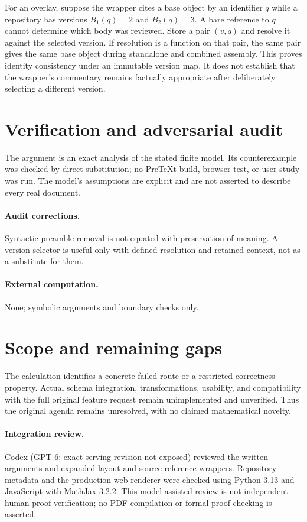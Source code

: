 \documentclass[11pt]{article}
\begin{document}
For an overlay, suppose the wrapper cites a base object by an identifier $q$ while a repository has versions $B_1(q)=2$ and $B_2(q)=3$. A bare reference to $q$ cannot determine which body was reviewed. Store a pair $(v,q)$ and resolve it against the selected version. If resolution is a function on that pair, the same pair gives the same base object during standalone and combined assembly. This proves identity consistency under an immutable version map. It does not establish that the wrapper's commentary remains factually appropriate after deliberately selecting a different version.
\section{Verification and adversarial audit}
The argument is an exact analysis of the stated finite model. Its counterexample was checked by direct substitution; no PreTeXt build, browser test, or user study was run. The model's assumptions are explicit and are not asserted to describe every real document.
\paragraph{Audit corrections.} Syntactic preamble removal is not equated with preservation of meaning. A version selector is useful only with defined resolution and retained context, not as a substitute for them.
\paragraph{External computation.} None; symbolic arguments and boundary checks only.
\section{Scope and remaining gaps}
The calculation identifies a concrete failed route or a restricted correctness property. Actual schema integration, transformations, usability, and compatibility with the full original feature request remain unimplemented and unverified. Thus the original agenda remains unresolved, with no claimed mathematical novelty.
\paragraph{Integration review.} Codex (GPT-6; exact serving revision not exposed) reviewed the written arguments and expanded layout and source-reference wrappers. Repository metadata and the production web renderer were checked using Python 3.13 and JavaScript with MathJax 3.2.2. This model-assisted review is not independent human proof verification; no PDF compilation or formal proof checking is asserted.
\end{document}
